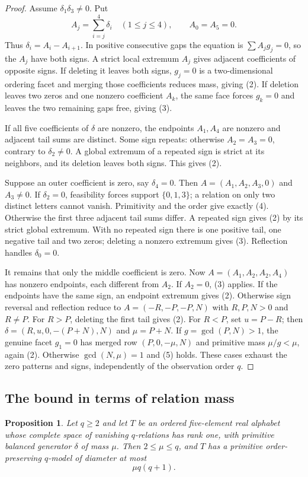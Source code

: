 \documentclass[11pt,reqno]{amsart}
\theoremstyle{plain}
\newtheorem{proposition}[theorem]{Proposition}
\theoremstyle{definition}
\theoremstyle{plain}
\theoremstyle{plain}
\theoremstyle{plain}
\theoremstyle{plain}
\theoremstyle{plain}
\theoremstyle{plain}
\theoremstyle{definition}
\theoremstyle{definition}
\theoremstyle{definition}
\theoremstyle{plain}
\begin{document}
\begin{proof}
Assume $\delta_1\delta_3\ne0$. Put
\[
 A_j=\sum_{i=j}^4\delta_i\quad(1\le j\le4),\qquad A_0=A_5=0.
\]
Thus $\delta_i=A_i-A_{i+1}$. In positive consecutive gaps the equation
is $\sum A_jg_j=0$, so the $A_j$ have both signs. A strict local
extremum $A_j$ gives adjacent coefficients of opposite signs. If deleting
it leaves both signs, $g_j=0$ is a two-dimensional ordering facet and
merging those coefficients reduces mass, giving (2). If deletion leaves
two zeros and one nonzero coefficient $A_k$, the same face forces
$g_k=0$ and leaves the two remaining gaps free, giving (3).

If all five coefficients of $\delta$ are nonzero, the endpoints $A_1,A_4$
are nonzero and adjacent tail sums are distinct. Some sign repeats:
otherwise $A_2=A_3=0$, contrary to $\delta_2\ne0$. A global extremum
of a repeated sign is strict at its neighbors, and its deletion leaves
both signs. This gives (2).

Suppose an outer coefficient is zero, say $\delta_4=0$. Then
$A=(A_1,A_2,A_3,0)$ and $A_3\ne0$. If $\delta_2=0$, feasibility
forces support $\{0,1,3\}$; a relation on only two distinct letters
cannot vanish. Primitivity and the order give exactly (4). Otherwise
the first three adjacent tail sums differ. A repeated sign gives (2)
by its strict global extremum. With no repeated sign there is one
positive tail, one negative tail and two zeros; deleting a nonzero
extremum gives (3). Reflection handles $\delta_0=0$.

It remains that only the middle coefficient is zero. Now
$A=(A_1,A_2,A_2,A_4)$ has nonzero endpoints, each different from $A_2$.
If $A_2=0$, (3) applies. If the endpoints have the same sign, an
endpoint extremum gives (2). Otherwise sign reversal and reflection
reduce to $A=(-R,-P,-P,N)$ with $R,P,N>0$ and $R\ne P$.
For $R>P$, deleting the first tail gives (2). For $R<P$, set $u=P-R$;
then $\delta=(R,u,0,-(P+N),N)$ and $\mu=P+N$.
If $g=\gcd(P,N)>1$, the genuine facet $g_1=0$ has merged row
$(P,0,-\mu,N)$ and primitive mass $\mu/g<\mu$, again (2).
Otherwise $\gcd(N,\mu)=1$ and (5) holds. These cases exhaust the
zero patterns and signs, independently of the observation order $q$.
\end{proof}

\subsection{The bound in terms of relation mass}
\begin{proposition}\label{M-prop:rank-one-mass}
Let $q\ge2$ and let $T$ be an ordered five-element real alphabet whose
complete space of vanishing $q$-relations has rank one, with primitive
balanced generator $\delta$ of mass $\mu$. Then $2\le\mu\le q$, and $T$ has
a primitive order-preserving $q$-model of diameter at most
\begin{equation}\label{M-eq:mass-sensitive}
 \mu q(q+1).
\end{equation}
\end{proposition}
\end{document}
